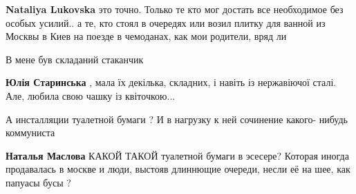 \begin{itemize}
\begin{itemize}
 
\textbf{Nataliya Lukovska} это точно. Только те кто мог достать все необходимое без особых усилий.. а те, кто стоял в очередях или возил плитку для ванной из Москвы в Киев на поезде в чемоданах, как мои родители, вряд ли

 
В мене був складаний стаканчик

 
\textbf{Юлія Старинська} , мала їх декілька, складних, і навіть із нержавіючої сталі. Але, любила свою чашку із квіточкою...
\end{itemize}

 
А инсталляции туалетной бумаги ? И в нагрузку к ней сочинение какого- нибудь
коммуниста

\begin{itemize}
 
\textbf{Наталья Маслова} КАКОЙ ТАКОЙ туалетной бумаги в эсесере? Которая иногда продавалась в москве и люди, выстояв длиннющие очереди, несли её на шее, как папуасы бусы ?

 

\end{itemize}
\end{itemize}
